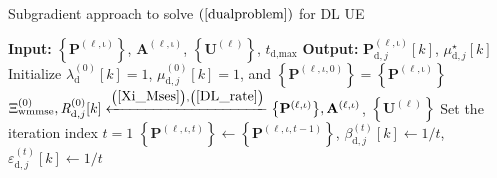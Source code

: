\documentclass[10pt,journal]{IEEEtran}
\newcommand{\paren}[1]{\left({#1}\right)}
\newcommand{\bracket}[1]{{\left [{#1}\right ]}}
\newcommand{\braces}[1]{{\left\{ {#1}\right\}}}
\newcommand{\sfrac}[2]{#1/#2}
\theoremstyle{definition}
\begin{document}
\begin{algorithm}[ht!]
\par\noindent\small
\caption{Subgradient approach to solve $\paren{\ref{dualproblem}}$ for DL UE}
\label{DLalgorithm}
\begin{algorithmic}[1]
\Statex \textbf{Input: } $\braces{\mathbf{P}^{\paren{\mathrm{\ell,\iota}}}}$,  $\mathbf{A}^{\paren{\mathrm{\ell,\iota}}}$, $\braces{\mathbf{U}^{\paren{\mathrm{\ell}}}}$, $t_{\textrm{d,max}}$
\Statex \textbf{Output:} $\mathbf{P}^{\paren{\mathrm{\ell,\iota}}}_{\textrm{d},j}\bracket{k}$, $\mu^\star_{\textrm{d},j}\bracket{k}$
\State Initialize $\lambda^{\paren{\mathrm{0}}}_{\textrm{d}}\bracket{k}=1$, $\mu^{\paren{\mathrm{0}}}_{\textrm{d},j}\bracket{k}=1$, and $\braces{\mathbf{P}^{\paren{\ell,\iota,0}}}=\braces{\mathbf{P}^{\paren{\mathrm{\ell,\iota}}}}$ 
\State $\Xi^{\paren{\mathrm{0}}}_{\textrm{wmmse}},\mathit{R}^{\paren{\mathrm{0}}}_{\textrm{d},j}\bracket{k}\xleftarrow{\paren{\mathrm{\ref{Xi_Mses}}},\paren{\mathrm{\ref{DL_rate}}}}\braces{\mathbf{P}^{\paren{\mathrm{\ell,\iota}}}},\mathbf{A}^{\paren{\mathrm{\ell,\iota}}}$, $\braces{\mathbf{U}^{\paren{\mathrm{\ell}}}}$
\State Set the iteration index $t=1$
\Repeat
\State $\braces{\mathbf{P}^{\paren{\ell,\iota,t}}}\leftarrow\braces{\mathbf{P}^{\paren{\ell,\iota,t-1}}}$, $\beta^{\paren{t}}_{\textrm{d},j}\bracket{k}\leftarrow\sfrac{1}{t}$, $\varepsilon^{\paren{t}}_{\textrm{d},j}\bracket{k}\leftarrow\sfrac{1}{t}$

\end{algorithmic}
\end{algorithm}
\end{document}

